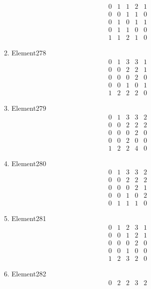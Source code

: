 \documentclass[12pt]{article}
\begin{document}
\begin{multicols}{3}
\begin{enumerate}
\begin{equation*}
\begin{array}{ccccc}
0&1&1&2&1\\
0&0&1&1&0\\
0&1&0&1&1\\
0&1&1&0&0\\
1&1&2&1&0
\end{array}
\end{equation*}
\item Element278
\begin{equation*}
\begin{array}{ccccc}
0&1&3&3&1\\
0&0&2&2&1\\
0&0&0&2&0\\
0&0&1&0&1\\
1&2&2&2&0
\end{array}
\end{equation*}
\item Element279
\begin{equation*}
\begin{array}{ccccc}
0&1&3&3&2\\
0&0&2&2&2\\
0&0&0&2&0\\
0&0&2&0&0\\
1&2&2&4&0
\end{array}
\end{equation*}
\item Element280
\begin{equation*}
\begin{array}{ccccc}
0&1&3&3&2\\
0&0&2&2&2\\
0&0&0&2&1\\
0&0&1&0&2\\
0&1&1&1&0
\end{array}
\end{equation*}
\item Element281
\begin{equation*}
\begin{array}{ccccc}
0&1&2&3&1\\
0&0&1&2&1\\
0&0&0&2&0\\
0&0&1&0&0\\
1&2&3&2&0
\end{array}
\end{equation*}
\item Element282
\begin{equation*}
\begin{array}{ccccc}
0&2&2&3&2\\

\end{array}
\end{equation*}
\end{enumerate}
\end{multicols}
\end{document}
